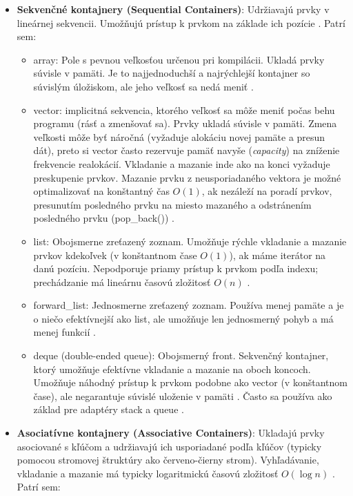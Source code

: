 \documentclass[11pt]{article}
\begin{document}
\begin{itemize}
  \item \textbf{Sekvenčné kontajnery (Sequential Containers)}: Udržiavajú prvky v lineárnej sekvencii. Umožňujú prístup k prvkom na základe ich pozície \cite{10162792}. Patrí sem:
  \begin{itemize}
    \item array: Pole s pevnou veľkosťou určenou pri kompilácii. Ukladá prvky súvisle v pamäti. Je to najjednoduchší a najrýchlejší kontajner so súvislým úložiskom, ale jeho veľkosť sa nedá meniť \cite{10162792}.
    \item vector: implicitná sekvencia, ktorého veľkosť sa môže meniť počas behu programu (rásť a zmenšovať sa). Prvky ukladá súvisle v pamäti. Zmena veľkosti môže byť náročná (vyžaduje alokáciu novej pamäte a presun dát), preto si vector často rezervuje pamäť navyše (\textit{capacity}) na zníženie frekvencie realokácií. Vkladanie a mazanie inde ako na konci vyžaduje preskupenie prvkov. Mazanie prvku z neusporiadaného vektora je možné optimalizovať na konštantný čas $O(1)$, ak nezáleží na poradí prvkov, presunutím posledného prvku na miesto mazaného a odstránením posledného prvku (pop\_back()) \cite{10162792}.
    \item list: Obojsmerne zreťazený zoznam. Umožňuje rýchle vkladanie a mazanie prvkov kdekoľvek (v konštantnom čase $O(1)$), ak máme iterátor na danú pozíciu. Nepodporuje priamy prístup k prvkom podľa indexu; prechádzanie má lineárnu časovú zložitosť $O(n)$ \cite{10162792}.
    \item forward\_list: Jednosmerne zreťazený zoznam. Používa menej pamäte a je o niečo efektívnejší ako list, ale umožňuje len jednosmerný pohyb a má menej funkcií \cite{10162792}.
    \item deque (double-ended queue): Obojsmerný front. Sekvenčný kontajner, ktorý umožňuje efektívne vkladanie a mazanie na oboch koncoch. Umožňuje náhodný prístup k prvkom podobne ako vector (v konštantnom čase), ale negarantuje súvislé uloženie v pamäti \cite{10162792}. Často sa používa ako základ pre adaptéry stack a queue \cite{10162792}.
  \end{itemize}
  \item \textbf{Asociatívne kontajnery (Associative Containers)}: Ukladajú prvky asociované s kľúčom a udržiavajú ich usporiadané podľa kľúčov (typicky pomocou stromovej štruktúry ako červeno-čierny strom). Vyhľadávanie, vkladanie a mazanie má typicky logaritmickú časovú zložitosť $O(\log n)$ \cite{10162792}. Patrí sem:
  \begin{itemize}

\end{itemize}
\end{itemize}
\end{document}
